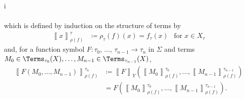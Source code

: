 \begin{partsolution}{i}
\begin{description}
\begin{align*}
\end{align*}
which is defined by induction on the structure of terms by
\begin{align*}
\left\llbracket x \right\rrbracket_{\rho(f)}^\tau &\coloneq \rho_\tau(f)(x) = f_\tau(x) &\text{for \(x \in X_\tau\)}
\end{align*}
and, for a function symbol \(F : \tau_0,\,\ldots,\,\tau_{n-1} \to \tau_n\) in \(\Sigma\) and terms \(M_0 \in \Terms_{\tau_0}(X), \ldots, M_{n-1} \in \Terms_{\tau_{n-1}}(X)\),
\begin{align*}
\left\llbracket F(M_0,\ldots,M_{n-1}) \right\rrbracket_{\rho(f)}^{\tau_n}
&\coloneq \left\llbracket F \right\rrbracket_Y\left(\left\llbracket M_0 \right\rrbracket_{\rho(f)}^{\tau_0}, \ldots, \left\llbracket M_{n-1} \right\rrbracket_{\rho(f)}^{\tau_{n-1}}\right) \\
&= F \left(\left\llbracket M_0 \right\rrbracket_{\rho(f)}^{\tau_0}, \ldots, \left\llbracket M_{n-1} \right\rrbracket_{\rho(f)}^{\tau_{n-1}}\right).
\end{align*}
\end{description}
\end{partsolution}

